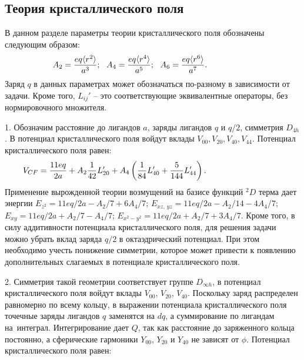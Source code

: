 \subsection{Теория кристаллического поля}
В данном разделе параметры теории кристаллического поля обозначены следующим образом:
\begin{equation*}
\begin{aligned}
& A_2 = \dfrac{eq \langle r^2 \rangle}{a^3};\,\,\,\, A_4 =\dfrac{eq \langle r^4 \rangle}{a^5};\,\,\,\, A_6 =\dfrac{eq \langle r^6 \rangle}{a^7}. \hspace{16mm}
\end{aligned}
\end{equation*}
Заряд $q$ в данных параметрах может обозначаться по-разному в зависимости от задачи. Кроме того, $L_{ij}'$ – это соответствующие эквивалентные операторы, без нормировочного множителя.\par
1. Обозначим расстояние до лигандов $a$, заряды лигандов $q$ и $q/2$, симметрия $D_{4h}$. В потенциал кристаллического поля войдут вклады $V_{00}, V_{20}, V_{40}, V_{44}$. Потенциал кристаллического поля равен:
\begin{equation*}
\begin{aligned}
& V_{CF}= \dfrac{11eq}{2a} + A_2 \dfrac{1}{42}L_{20}' + A_4 \left(\dfrac{ 1}{84}L_{40}'  + \dfrac{5 }{144}L_{44}'\right). \hspace{29mm}
\end{aligned}
\end{equation*}
Применение вырожденной теории возмущений на базисе функций $^2D$ терма дает энергии $E_{z^2} = 11eq/2a - A_2/7 + {6A_4}/{7}$; $E_{xz,\, yz} = 11eq/2a -{A_2}/{14} - {4A_4}/{7}$; $E_{xy} = 11eq/2a + {A_2}/{7} - {A_4}/{7}$; $E_{x^2-y^2} = 11eq/2a + {A_2}/{7} + {3A_4}/{7}$. Кроме того, в силу аддитивности потенциала кристаллического поля, для решения задачи можно убрать вклад заряда ${q}/{2}$ в октаэдрический потенциал. При этом необходимо учесть понижение симметрии, которое может привести к появлению дополнительных слагаемых в потенциале кристаллического поля.\par
2. Симметрия такой геометрии соответствует группе $D_{\infty h}$, в потенциал кристаллического поля войдут вклады $V_{00}$, $V_{20}$, $V_{40}$. Поскольку заряд распределен равномерно по всему кольцу, в выражении потенциала кристаллического поля точечные заряды лигандов $q$ заменятся на $dq$, а суммирование по лигандам на~интеграл. Интегрирование дает $Q$, так как расстояние до заряженного кольца постоянно, а сферические гармоники $\textit{Y}_{00}$, $\textit{Y}_{20}$ и  $\textit{Y}_{40}$ не зависят от $\phi$. Потенциал кристаллического поля равен:
